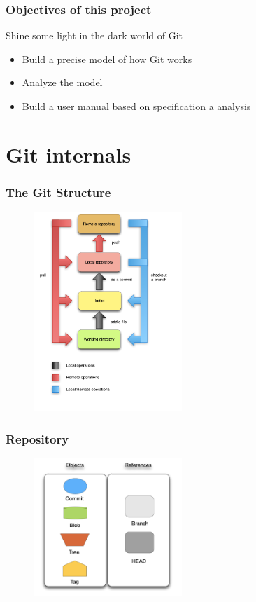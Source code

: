 \documentclass{beamer}
\begin{document}
\begin{frame}
	\frametitle{Objectives of this project}
	\begin{block}{Shine some light in the dark world of Git}
		\begin{itemize}
			\item Build a precise model of how Git works
			\item Analyze the model
			\item Build a user manual based on specification a
			analysis 
		\end{itemize}
	\end{block}
\end{frame}


\section{Git internals}

\begin{frame}
   \frametitle{The Git Structure}
   \begin{figure}
      \centering
      \includegraphics[width=0.5\textwidth]{images/git_workflow.png}
   \end{figure}
\end{frame}


\begin{frame}
\frametitle{Repository}
   \begin{figure}
      \centering
      \includegraphics[width=0.5\textwidth]{images/legenda2.png}
   \end{figure}
\end{frame}
\end{document}

